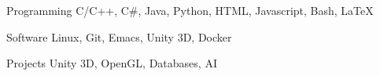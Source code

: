 

\begin{cvskills}

  \cvskill
    {Programming} %
    {C/C++, C\#, Java, Python, HTML, Javascript, Bash, LaTeX}

  \cvskill
    {Software} %
    {Linux, Git, Emacs, Unity 3D, Docker} %

  \cvskill
    {Projects} %
    {Unity 3D, OpenGL, Databases, AI} %


\end{cvskills}
